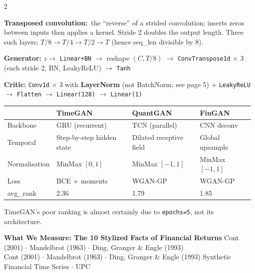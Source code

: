 \documentclass[10pt]{article}
\newcommand{\navybox}[2]{\begin{tcolorbox}[mybox={Navy}{LBg},title={#1}]#2\end{tcolorbox}}
\newcommand{\pagehead}[2]{%
  \begin{tcolorbox}[enhanced,arc=0pt,outer arc=0pt,boxrule=0pt,
    colback=Navy,colframe=Navy,
    top=5pt,bottom=5pt,left=8pt,right=8pt,
    before skip=0pt,after skip=10pt]
  {\color{white}\large\bfseries #1}%
  \ifx\relax#2\relax\else\\[1pt]{\color{blue!30!white}\small #2}\fi
  \hfill{\color{blue!20!white}\footnotesize Synthetic Financial Time Series $\cdot$ UPC}
  \end{tcolorbox}}
\begin{document}
\begin{multicols}{2}
\columnbreak

\begin{tcolorbox}[mybox={FGcol}{GBg},title={FinGAN --- CNN Deconvolution WGAN-GP}]
\textbf{Transposed convolution:}\ the ``reverse'' of a strided convolution; inserts zeros between inputs then applies a kernel. Stride 2 doubles the output length. Three such layers: $T/8 \to T/4 \to T/2 \to T$ (hence seq\_len divisible by 8).

\textbf{Generator:} $z \to$ \texttt{Linear+BN} $\to$ reshape $(C, T/8)$ $\to$ \texttt{ConvTranspose1d} $\times$ 3 (each stride 2, BN, LeakyReLU) $\to$ \texttt{Tanh}

\textbf{Critic:} \texttt{Conv1d} $\times$ 3 with \textbf{LayerNorm} (not BatchNorm; see page 5) + \texttt{LeakyReLU} $\to$ \texttt{Flatten} $\to$ \texttt{Linear(128)} $\to$ \texttt{Linear(1)}
\end{tcolorbox}

\navybox{Architectural Comparison}{%
\small\renewcommand{\arraystretch}{1.3}
\begin{tabularx}{\linewidth}{@{}lXXX@{}}
\toprule
& \textbf{TimeGAN} & \textbf{QuantGAN} & \textbf{FinGAN} \\
\midrule
Backbone      & GRU (recurrent)          & TCN (parallel)          & CNN deconv \\
Temporal      & Step-by-step hidden state & Dilated receptive field & Global upsample \\
Normalisation & MinMax $[0,1]$            & MinMax $[-1,1]$         & MinMax $[-1,1]$ \\
Loss          & BCE + moments             & WGAN-GP                 & WGAN-GP \\
avg\_rank     & 2.36                      & 1.79                    & 1.85 \\
\bottomrule
\end{tabularx}
\footnotesize TimeGAN's poor ranking is almost certainly due to \texttt{epochs=5}, not its architecture.}

\end{multicols}

\clearpage

\pagehead{What We Measure: The 10 Stylized Facts of Financial Returns}
         {Cont (2001) $\cdot$ Mandelbrot (1963) $\cdot$ Ding, Granger \& Engle (1993)}
\end{document}
